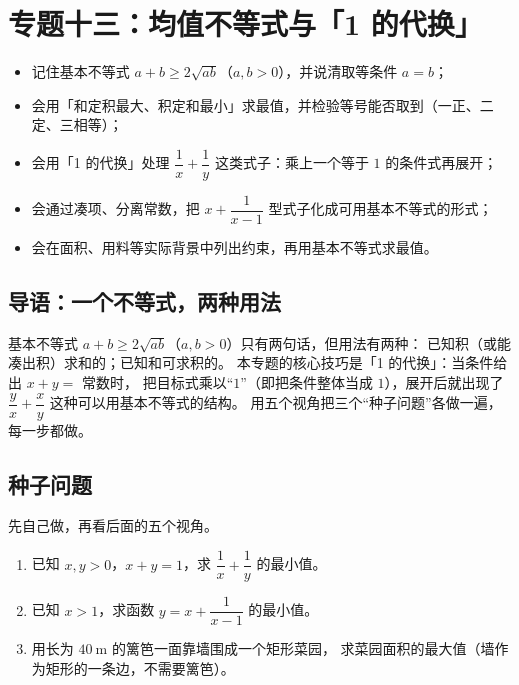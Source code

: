 \section{专题十三：均值不等式与「1 的代换」}

\begin{learnobjective}
\begin{itemize}
  \item 记住基本不等式 $a+b\geq2\sqrt{ab}$（$a,b>0$），并说清取等条件 $a=b$；
  \item 会用「和定积最大、积定和最小」求最值，并检验等号能否取到（一正、二定、三相等）；
  \item 会用「1 的代换」处理 $\dfrac1x+\dfrac1y$ 这类式子：乘上一个等于 $1$ 的条件式再展开；
  \item 会通过凑项、分离常数，把 $x+\dfrac{1}{x-1}$ 型式子化成可用基本不等式的形式；
  \item 会在面积、用料等实际背景中列出约束，再用基本不等式求最值。
\end{itemize}
\end{learnobjective}

\begin{preview}
\subsection{导语：一个不等式，两种用法}
基本不等式 $a+b\geq2\sqrt{ab}$（$a,b>0$）只有两句话，但用法有两种：
已知积（或能凑出积）求和的；已知和可求积的。
本专题的核心技巧是「1 的代换」：当条件给出 $x+y=$ 常数时，
把目标式乘以“$1$”（即把条件整体当成 $1$），展开后就出现了 $\dfrac{y}{x}+\dfrac{x}{y}$
这种可以用基本不等式的结构。
用五个视角把三个“种子问题”各做一遍，每一步都做。

\subsection{种子问题}
先自己做，再看后面的五个视角。
\begin{enumerate}
  \item 已知 $x,y>0$，$x+y=1$，求 $\dfrac1x+\dfrac1y$ 的最小值。
  \item 已知 $x>1$，求函数 $y=x+\dfrac{1}{x-1}$ 的最小值。
  \item 用长为 $40\ \mathrm{m}$ 的篱笆一面靠墙围成一个矩形菜园，
        求菜园面积的最大值（墙作为矩形的一条边，不需要篱笆）。
\end{enumerate}
\end{preview}

